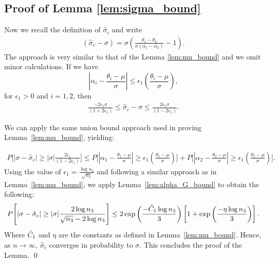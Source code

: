 \documentclass[10pt]{article} %
\def\eqref#1{equation~\ref{#1}}
\theoremstyle{plain}
\theoremstyle{definition}
\theoremstyle{remark}
\begin{document}
\subsection{Proof of Lemma \ref{lem:sigma_bound}}


Now we recall the definition of \(\hat{\sigma}_c\) and write
\begin{align}
\left(   \hat{\sigma}_c  - \sigma  \right)  =  \sigma  \left ( \frac{\theta_1 - \theta_2}{\sigma(\alpha_1 - \alpha_2)} - 1 \right ). \label{sigma - sigmahat} 
\end{align}
The approach is very similar to that of the Lemma \ref{lem:mu_bound} and we omit minor calculations. If we have
\[
\left| \alpha_i - \frac{\theta_i - \mu}{\sigma} \right| \leq \epsilon_1 \left( \frac{\theta_i - \mu}{\sigma} \right),
\]
for $\epsilon_1>0$ and $i=1,2$, then
\begin{align*}
   \frac{- 2\epsilon_1 \sigma }{\left(  1 + 2\epsilon_1 \right)} \leq   \hat{\sigma}_c  - \sigma \leq    \frac{2\epsilon_1 \sigma }{\left(  1 - 2\epsilon_1 \right)}.
\end{align*}


 

We can apply the same union bound approach used in proving Lemma~\ref{lem:mu_bound}, yielding:

\begin{align*}
P \Bigg [  \vert    \sigma - \hat{\sigma}_c  \vert \geq  \vert \sigma \vert \frac{ 2\epsilon_1 }{\left(  1 - 2\epsilon_1 \right)} \Bigg] \leq  P \Bigg[   \left | \alpha_1 -  \frac{\theta_1 - \mu}{\sigma}    \right |  \geq \epsilon_1 \left(  \frac{\theta_1 - \mu }{\sigma}\right)   \Bigg] +  P \Bigg[    \left |    \alpha_2 -  \frac{\theta_2 - \mu}{\sigma}    \right |   \geq \epsilon_1 \left(  \frac{\theta_2 - \mu }{\sigma}\right)  \Bigg].
\end{align*}
Using the value of \( \epsilon_1 = \frac{\log n_3}{\sqrt{n_3}} \) and following a similar approach as in Lemma~\ref{lem:mu_bound}, we apply Lemma~\ref{lem:alpha_G_bound} to obtain the following:
\begin{align*}
P \Bigg [  \vert \sigma - \hat{\sigma}_c  \vert \geq |\sigma|    \frac{2\log n_3 }{ \sqrt{n_3} - 2\log n_3}  \Bigg]  \leq 2  \exp \left( \frac{ -\Tilde{C}_1 \log n_3}{3} \right)  \left[ 1+ \exp \left(  \frac{ -\eta \log n_3 }{3}\right)  \right ].
\end{align*}
Where \(\Tilde{C}_1\) and \(\eta\) are the constants as defined in Lemma~\ref{lem:mu_bound}. Hence, as \(n \to \infty\), \(\hat{\sigma}_c\) converges in probability to $\sigma$. This concludes the proof of the Lemma.  
\qed
\end{document}
